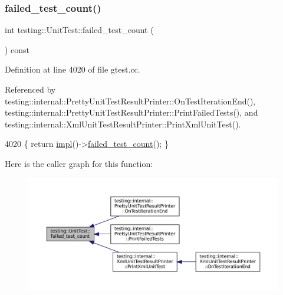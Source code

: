\subsubsection{\texorpdfstring{failed\+\_\+test\+\_\+count()}{failed\_test\_count()}}
{\footnotesize\ttfamily int testing\+::\+Unit\+Test\+::failed\+\_\+test\+\_\+count (\begin{DoxyParamCaption}{ }\end{DoxyParamCaption}) const}



Definition at line 4020 of file gtest.\+cc.



Referenced by testing\+::internal\+::\+Pretty\+Unit\+Test\+Result\+Printer\+::\+On\+Test\+Iteration\+End(), testing\+::internal\+::\+Pretty\+Unit\+Test\+Result\+Printer\+::\+Print\+Failed\+Tests(), and testing\+::internal\+::\+Xml\+Unit\+Test\+Result\+Printer\+::\+Print\+Xml\+Unit\+Test().


\begin{DoxyCode}
4020 \{ \textcolor{keywordflow}{return} \hyperlink{classtesting_1_1UnitTest_a4df5d11a58affb337d7fa62eaa07690e}{impl}()->\hyperlink{classtesting_1_1internal_1_1UnitTestImpl_ad0abe95b66466268363d7fa407bac41b}{failed\_test\_count}(); \}
\end{DoxyCode}
Here is the caller graph for this function\+:
\nopagebreak
\begin{figure}[H]
\begin{center}
\leavevmode
\includegraphics[width=350pt]{classtesting_1_1UnitTest_ace1c860482b4ae5c341df5a9665e5c08_icgraph}
\end{center}
\end{figure}
\mbox{\label{classtesting_1_1UnitTest_a24192400b70b3b946746954e9574fb8e}} 
